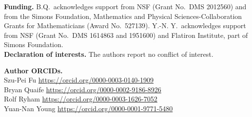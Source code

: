 \documentclass[lineno]{jfm}
\begin{document}
\noindent
  {\bf Funding.} B.Q.~acknowledges support from NSF (Grant
  No.~DMS 2012560) and from the Simons Foundation, Mathematics and
  Physical Sciences-Collaboration Grants for Mathematicians (Award
  No.~527139). Y.-N. Y.~acknowledges support from NSF (Grant No.~DMS 1614863 and 1951600) and Flatiron Institute, part of Simons Foundation.\\
  
  \noindent
  {\bf Declaration of interests.} The authors report no conflict of interest.\\
  
  
  
\noindent
{\bf Author ORCIDs.}\\
 Szu-Pei Fu  {\url{https://orcid.org/0000-0003-0140-1909}}\\
 Bryan Quaife {\url{https://orcid.org/0000-0002-9186-8926}}\\  
 Rolf Ryham {\url{https://orcid.org/0000-0003-1626-7052}}\\  
 Yuan-Nan Young  {\url{https://orcid.org/0000-0001-9771-5480 }}
  

%







%
%


%
\end{document}
